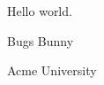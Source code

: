 \documentclass[a4paper,12pt]{article}
\begin{document}
Hello world.
\centerline{\Huge{Bugs Bunny}}
\centerline{\Huge{Acme University}}
\end{document}
